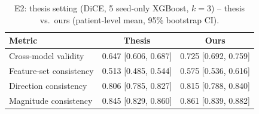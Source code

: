 \begin{table}[t]
\centering
\caption{E2: thesis setting (DiCE, 5 seed-only XGBoost, $k=3$) -- thesis vs.\ ours (patient-level mean, 95\% bootstrap CI).}
\label{tab:rep}
\footnotesize
\setlength{\tabcolsep}{3pt}
\begin{tabular}{lcc}
\toprule
Metric & Thesis & Ours \\
\midrule
Cross-model validity & 0.647 [0.606, 0.687] & 0.725 [0.692, 0.759] \\
Feature-set consistency & 0.513 [0.485, 0.544] & 0.575 [0.536, 0.616] \\
Direction consistency & 0.806 [0.785, 0.827] & 0.815 [0.788, 0.840] \\
Magnitude consistency & 0.845 [0.829, 0.860] & 0.861 [0.839, 0.882] \\
\bottomrule
\end{tabular}
\end{table}
